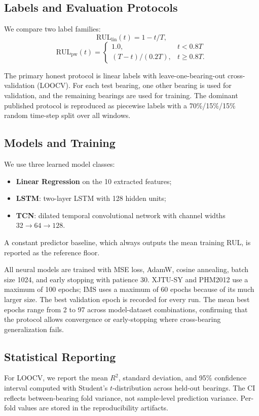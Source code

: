 \documentclass[5p,twocolumn]{elsarticle}
\begin{document}
\subsection{Labels and Evaluation Protocols}
We compare two label families:
\begin{equation}
\text{RUL}_{\text{lin}}(t) = 1 - t/T,
\label{eq:linear}
\end{equation}
\begin{equation}
\text{RUL}_{\text{pw}}(t) =
\begin{cases}
1.0, & t < 0.8T \\
(T - t)/(0.2T), & t \geq 0.8T.
\end{cases}
\label{eq:piecewise}
\end{equation}

The primary honest protocol is linear labels with leave-one-bearing-out cross-validation (LOOCV). For each test bearing, one other bearing is used for validation, and the remaining bearings are used for training. The dominant published protocol is reproduced as piecewise labels with a 70\%/15\%/15\% random time-step split over all windows.

\subsection{Models and Training}
We use three learned model classes:
\begin{itemize}
    \item \textbf{Linear Regression} on the 10 extracted features;
    \item \textbf{LSTM}: two-layer LSTM with 128 hidden units;
    \item \textbf{TCN}: dilated temporal convolutional network with channel widths $32 \to 64 \to 128$.
\end{itemize}
A constant predictor baseline, which always outputs the mean training RUL, is reported as the reference floor.

All neural models are trained with MSE loss, AdamW, cosine annealing, batch size 1024, and early stopping with patience 30. XJTU-SY and PHM2012 use a maximum of 100 epochs; IMS uses a maximum of 60 epochs because of its much larger size. The best validation epoch is recorded for every run. The mean best epochs range from 2 to 97 across model-dataset combinations, confirming that the protocol allows convergence or early-stopping where cross-bearing generalization fails.

\subsection{Statistical Reporting}
For LOOCV, we report the mean $R^2$, standard deviation, and 95\% confidence interval computed with Student's $t$-distribution across held-out bearings. The CI reflects between-bearing fold variance, not sample-level prediction variance. Per-fold values are stored in the reproducibility artifacts.
\end{document}
